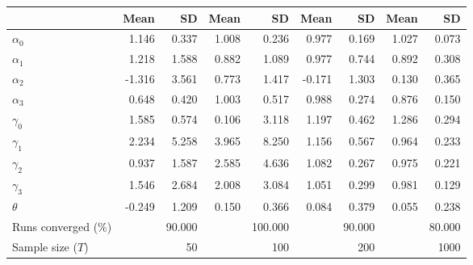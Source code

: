 
\begin{tabular}[t]{lrrrrrrrr}
\toprule
  & Mean & SD & Mean  & SD  & Mean   & SD   & Mean    & SD   \\
\midrule
$\alpha_{0}$ & 1.146 & 0.337 & 1.008 & 0.236 & 0.977 & 0.169 & 1.027 & 0.073\\
$\alpha_{1}$ & 1.218 & 1.588 & 0.882 & 1.089 & 0.977 & 0.744 & 0.892 & 0.308\\
$\alpha_{2}$ & -1.316 & 3.561 & 0.773 & 1.417 & -0.171 & 1.303 & 0.130 & 0.365\\
$\alpha_{3}$ & 0.648 & 0.420 & 1.003 & 0.517 & 0.988 & 0.274 & 0.876 & 0.150\\
$\gamma_{0}$ & 1.585 & 0.574 & 0.106 & 3.118 & 1.197 & 0.462 & 1.286 & 0.294\\
$\gamma_{1}$ & 2.234 & 5.258 & 3.965 & 8.250 & 1.156 & 0.567 & 0.964 & 0.233\\
$\gamma_{2}$ & 0.937 & 1.587 & 2.585 & 4.636 & 1.082 & 0.267 & 0.975 & 0.221\\
$\gamma_{3}$ & 1.546 & 2.684 & 2.008 & 3.084 & 1.051 & 0.299 & 0.981 & 0.129\\
$\theta$ & -0.249 & 1.209 & 0.150 & 0.366 & 0.084 & 0.379 & 0.055 & 0.238\\
Runs converged (\%) &  & 90.000 &  & 100.000 &  & 90.000 &  & 80.000\\
Sample size ($T$) &  & 50 &  & 100 &  & 200 &  & 1000\\
\bottomrule
\end{tabular}
